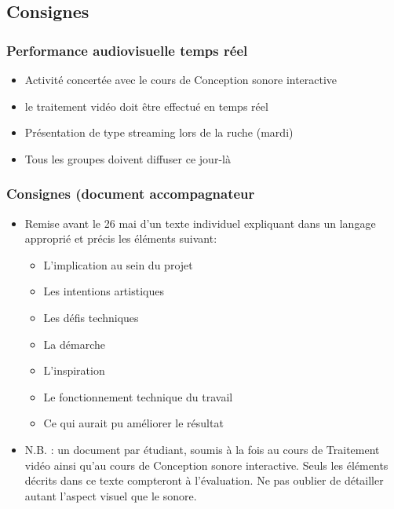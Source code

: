\documentclass[
  french,
]{book}
\providecommand{\tightlist}{%
  \setlength{\itemsep}{0pt}\setlength{\parskip}{0pt}}
\begin{document}
\hypertarget{consignes-4}{%
\subsection{Consignes}\label{consignes-4}}

\hypertarget{performance-audiovisuelle-temps-ruxe9el}{%
\subsubsection{Performance audiovisuelle temps réel}\label{performance-audiovisuelle-temps-ruxe9el}}

\begin{itemize}
\tightlist
\item
  Activité concertée avec le cours de Conception sonore interactive
\item
  le traitement vidéo doit être effectué en temps réel
\item
  Présentation de type streaming lors de la ruche (mardi)
\item
  Tous les groupes doivent diffuser ce jour-là
\end{itemize}

\hypertarget{consignes-document-accompagnateur}{%
\subsubsection{Consignes (document accompagnateur}\label{consignes-document-accompagnateur}}

\begin{itemize}
\tightlist
\item
  Remise avant le 26 mai d'un texte individuel expliquant dans un langage approprié et précis les éléments suivant:

  \begin{itemize}
  \tightlist
  \item
    L'implication au sein du projet
  \item
    Les intentions artistiques
  \item
    Les défis techniques
  \item
    La démarche
  \item
    L'inspiration
  \item
    Le fonctionnement technique du travail
  \item
    Ce qui aurait pu améliorer le résultat
  \end{itemize}
\item
  N.B. : un document par étudiant, soumis à la fois au cours de Traitement vidéo ainsi qu'au cours de Conception sonore interactive. Seuls les éléments décrits dans ce texte compteront à l'évaluation. Ne pas oublier de détailler autant l'aspect visuel que le sonore.
\end{itemize}
\end{document}
